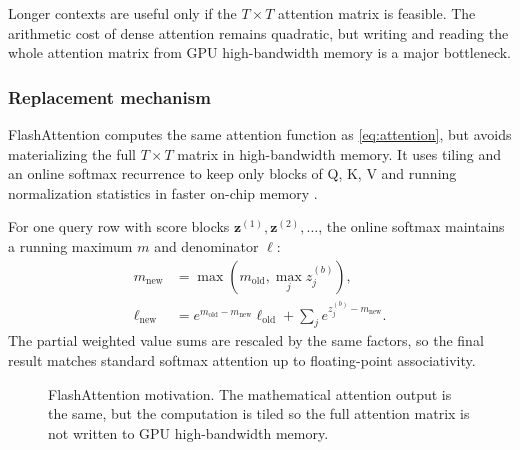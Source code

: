 \documentclass[11pt,a4paper]{article}
\theoremstyle{definition}
\theoremstyle{plain}
\newcommand{\vz}{\bm{z}}
\newcommand{\mO}{\bm{O}}
\begin{document}
Longer contexts are useful only if the $T\times T$ attention matrix is feasible. The arithmetic cost of dense attention remains quadratic, but writing and reading the whole attention matrix from GPU high-bandwidth memory is a major bottleneck.

\subsubsection{Replacement mechanism}

FlashAttention computes the same attention function as \cref{eq:attention}, but avoids materializing the full $T\times T$ matrix in high-bandwidth memory. It uses tiling and an online softmax recurrence to keep only blocks of Q, K, V and running normalization statistics in faster on-chip memory \cite{dao2022flashattention}.

For one query row with score blocks $\vz^{(1)},\vz^{(2)},\ldots$, the online softmax maintains a running maximum $m$ and denominator $\ell$:
\begin{align}
    m_{\mathrm{new}}&=\max(m_{\mathrm{old}},\max_j z^{(b)}_j),\\
    \ell_{\mathrm{new}}&=
    e^{m_{\mathrm{old}}-m_{\mathrm{new}}}\ell_{\mathrm{old}}
    +\sum_j e^{z^{(b)}_j-m_{\mathrm{new}}}.
\end{align}
The partial weighted value sums are rescaled by the same factors, so the final result matches standard softmax attention up to floating-point associativity.

\begin{figure}[H]
\centering
{}
\caption{FlashAttention motivation. The mathematical attention output is the same, but the computation is tiled so the full attention matrix is not written to GPU high-bandwidth memory.}
\label{fig:flashattention}
\end{figure}
\end{document}
